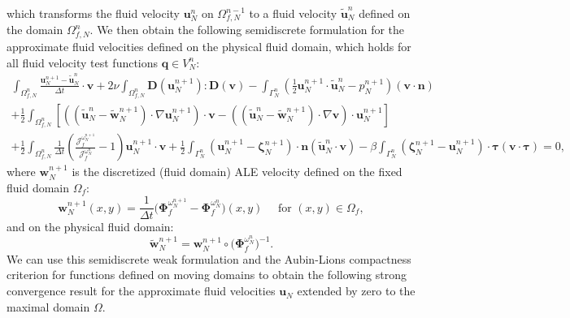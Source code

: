 \documentclass[11pt]{article}
\newcommand{\bd}{\boldsymbol}
\theoremstyle{definition}
\begin{document}
which transforms the fluid velocity $\bd{u}^{n}_{N}$ on $\Omega^{n - 1}_{f, N}$ to a fluid velocity $\tilde{\bd{u}}^{n}_{N}$ defined on the domain $\Omega^{n}_{f, N}$. We then obtain the following semidiscrete formulation for the approximate fluid velocities defined on the physical fluid domain, which holds for all fluid velocity test functions $\bd{q} \in V^{n}_{N}$:
\begin{multline}\label{fluidnN}
\int_{\Omega^{n}_{f, N}} \frac{\bd{u}^{n + 1}_{N} - \tilde{\bd{u}}^{n}_{N}}{\Delta t} \cdot \bd{v} + 2\nu \int_{\Omega^{n}_{f, N}} \bd{D}(\bd{u}^{n + 1}_{N}) : \bd{D}(\bd{v}) -  \int_{\Gamma^{n}_{N}} \left(\frac{1}{2} \bd{u}^{n + 1}_{N} \cdot \tilde{\bd{u}}^{n}_{N} - p^{n + 1}_{N}\right) (\bd{v} \cdot \bd{n}) \\
+ \frac{1}{2} \int_{\Omega^{n}_{f, N}} \left[\left(\left(\tilde{\bd{u}}^{n}_{N} - \tilde{\bd{w}}^{n + 1}_{N}\right) \cdot \nabla \bd{u}^{n + 1}_{N}\right) \cdot \bd{v} - \left(\left(\tilde{\bd{u}}^{n}_{N} - \tilde{\bd{w}}^{n + 1}_{N}\right) \cdot \nabla \bd{v}\right) \cdot \bd{u}^{n + 1}_{N}\right] \\
+ \frac{1}{2} \int_{\Omega^{n}_{f, N}} \frac{1}{\Delta t} \left(\frac{\mathcal{J}^{\omega^{n + 1}_{N}}_{f}}{\mathcal{J}^{\omega^{n}_{N}}_{f}} - 1\right) \bd{u}^{n + 1}_{N} \cdot \bd{v} + \frac{1}{2} \int_{\Gamma^{n}_{N}} \left(\bd{u}^{n + 1}_{N} - \bd{\zeta}^{n + 1}_{N}\right) \cdot \bd{n} (\tilde{\bd{u}}^{n}_{N} \cdot \bd{v}) - \beta \int_{\Gamma^{n}_{N}} \left(\bd{\zeta}^{n + 1}_{N} - \bd{u}^{n + 1}_{N}\right) \cdot \bd{\tau} (\bd{v} \cdot \bd{\tau}) = 0,
\end{multline}
where $\bd{w}^{n + 1}_{N}$ is the discretized (fluid domain) ALE velocity defined on the fixed fluid domain $\Omega_{f}$:
\begin{equation}\label{wale}
\bd{w}^{n + 1}_{N}(x, y) = \frac{1}{\Delta t}\Big(\bd{\Phi}^{\omega^{n + 1}_{N}}_{f} - \bd{\Phi}^{\omega^{n}_{N}}_{f}\Big)(x, y) \quad \text{ for } (x, y) \in \Omega_{f},
\end{equation}
and on the physical fluid domain:
\begin{equation}\label{tildew}
\tilde{\bd{w}}^{n + 1}_{N} = \bd{w}^{n + 1}_{N} \circ \Big(\bd{\Phi}^{\omega^{n}_{N}}_{f}\Big)^{-1}.
\end{equation}
We can use this semidiscrete weak formulation and the Aubin-Lions compactness criterion for functions defined on moving domains \cite{AubinLions} to obtain the following strong convergence result for the approximate fluid velocities $\bd{u}_{N}$ extended by zero to the maximal domain $\Omega$. 
\end{document}
